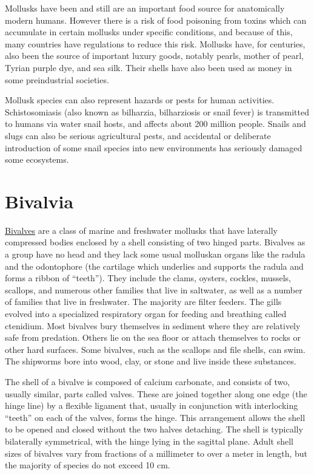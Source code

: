 Mollusks have been and still are an important food source for
anatomically modern humans. However there is a risk of food poisoning
from toxins which can accumulate in certain mollusks under specific
conditions, and because of this, many countries have regulations to
reduce this risk. Mollusks have, for centuries, also been the source of
important luxury goods, notably pearls, mother of pearl, Tyrian purple
dye, and sea silk. Their shells have also been used as money in some
preindustrial societies.

Mollusk species can also represent hazards or pests for human
activities. Schistosomiasis (also known as bilharzia, bilharziosis or
snail fever) is transmitted to humans via water snail hosts, and affects
about 200 million people. Snails and slugs can also be serious
agricultural pests, and accidental or deliberate introduction of some
snail species into new environments has seriously damaged some
ecosystems.

\section{Bivalvia}\label{bivalvia}

\href{https://en.wikipedia.org/wiki/Bivalvia}{Bivalves} are a class of
marine and freshwater mollusks that have laterally compressed bodies
enclosed by a shell consisting of two hinged parts. Bivalves as a group
have no head and they lack some usual molluskan organs like the radula
and the odontophore (the cartilage which underlies and supports the
radula and forms a ribbon of ``teeth''). They include the clams,
oysters, cockles, mussels, scallops, and numerous other families that
live in saltwater, as well as a number of families that live in
freshwater. The majority are filter feeders. The gills evolved into a
specialized respiratory organ for feeding and breathing called
ctenidium. Most bivalves bury themselves in sediment where they are
relatively safe from predation. Others lie on the sea floor or attach
themselves to rocks or other hard surfaces. Some bivalves, such as the
scallops and file shells, can swim. The shipworms bore into wood, clay,
or stone and live inside these substances.

The shell of a bivalve is composed of calcium carbonate, and consists of
two, usually similar, parts called valves. These are joined together
along one edge (the hinge line) by a flexible ligament that, usually in
conjunction with interlocking ``teeth'' on each of the valves, forms the
hinge. This arrangement allows the shell to be opened and closed without
the two halves detaching. The shell is typically bilaterally
symmetrical, with the hinge lying in the sagittal plane. Adult shell
sizes of bivalves vary from fractions of a millimeter to over a meter in
length, but the majority of species do not exceed 10 cm.

